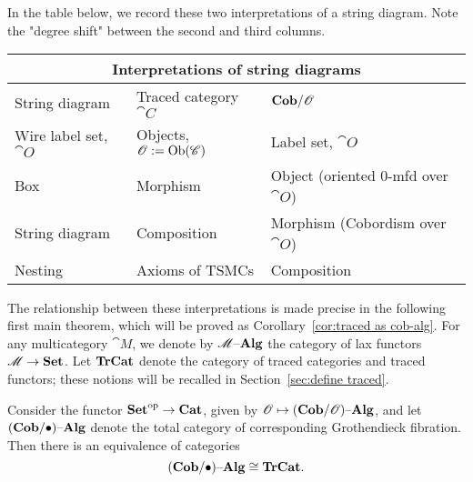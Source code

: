 \documentclass[12pt,oneside,article,draft]{memoir}
\begin{document}
In the table below, we record these two interpretations of a string diagram. Note the "degree shift" between the second and third columns.
\begin{center}
\begin{tabular}{lll}
\toprule
\multicolumn{3}{c}{Interpretations of string diagrams} \\
\midrule
String diagram & Traced category $\cat{C}$ & $\mathbf{Cob}/\mathscr{O}$ \\
\midrule
Wire label set, $\cat{O}$ & Objects, $\mathscr{O}:=\operatorname{Ob}(\mathscr{C})$ & Label set, $\cat{O}$ \\
Box & Morphism & Object (oriented 0-mfd over $\cat{O}$) \\
String diagram & Composition & Morphism (Cobordism over $\cat{O}$) \\
Nesting & Axioms of TSMCs & Composition \\
\bottomrule
\end{tabular}
\end{center}

The relationship between these interpretations is made precise in the following first main theorem, which will be proved as Corollary~\ref{cor:traced as cob-alg}. For any multicategory $\cat{M}$, we denote by $\mathscr{M}{\text \textendash}\mathbf{Alg}$ the category of lax functors $\mathscr{M}\to\mathbf{Set}$. Let $\mathbf{TrCat}$ denote the category of traced categories and traced functors; these notions will be recalled in Section~\ref{sec:define traced}.

\begin{theorem}\label{thm:traced as cob-alg}
Consider the functor ${\mathbf{Set}}^{\text{op}}\to\mathbf{Cat}$, given by $\mathscr{O}\mapsto(\mathbf{Cob}/\mathscr{O}){\text \textendash}\mathbf{Alg}$, and let $(\mathbf{Cob}/\bullet){\text \textendash}\mathbf{Alg}$ denote the total category of corresponding Grothendieck fibration. Then there is an equivalence of categories
$$(\mathbf{Cob}/\bullet){\text \textendash}\mathbf{Alg}\cong\mathbf{TrCat}.$$
\end{theorem}
\end{document}

